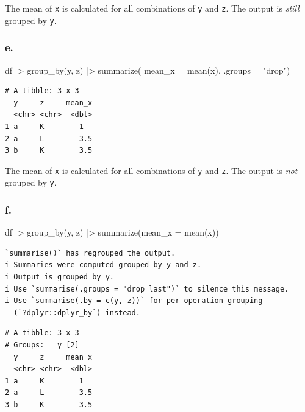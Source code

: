 \documentclass[
  letterpaper,
  DIV=11,
  numbers=noendperiod]{scrreprt}
\newenvironment{Shaded}{\begin{snugshade}}{\end{snugshade}}
\newcommand{\AttributeTok}[1]{\textcolor[rgb]{0.40,0.45,0.13}{#1}}
\newcommand{\FunctionTok}[1]{\textcolor[rgb]{0.28,0.35,0.67}{#1}}
\newcommand{\NormalTok}[1]{\textcolor[rgb]{0.00,0.23,0.31}{#1}}
\newcommand{\SpecialCharTok}[1]{\textcolor[rgb]{0.37,0.37,0.37}{#1}}
\newcommand{\StringTok}[1]{\textcolor[rgb]{0.13,0.47,0.30}{#1}}
\begin{document}
The mean of \texttt{x} is calculated for all combinations of \texttt{y}
and \texttt{z}. The output is \emph{still} grouped by \texttt{y}.

\subsubsection{e.}\label{e.}

\begin{Shaded}
\begin{Highlighting}[]
\NormalTok{df }\SpecialCharTok{|\textgreater{}}
  \FunctionTok{group\_by}\NormalTok{(y, z) }\SpecialCharTok{|\textgreater{}}
  \FunctionTok{summarize}\NormalTok{(}
    \AttributeTok{mean\_x =} \FunctionTok{mean}\NormalTok{(x),}
    \AttributeTok{.groups =} \StringTok{"drop"}\NormalTok{)}
\end{Highlighting}
\end{Shaded}

\begin{verbatim}
# A tibble: 3 x 3
  y     z     mean_x
  <chr> <chr>  <dbl>
1 a     K        1  
2 a     L        3.5
3 b     K        3.5
\end{verbatim}

The mean of \texttt{x} is calculated for all combinations of \texttt{y}
and \texttt{z}. The output is \emph{not} grouped by \texttt{y}.

\subsubsection{f.}\label{f.}

\begin{Shaded}
\begin{Highlighting}[]
\NormalTok{df }\SpecialCharTok{|\textgreater{}}
  \FunctionTok{group\_by}\NormalTok{(y, z) }\SpecialCharTok{|\textgreater{}}
  \FunctionTok{summarize}\NormalTok{(}\AttributeTok{mean\_x =} \FunctionTok{mean}\NormalTok{(x))}
\end{Highlighting}
\end{Shaded}

\begin{verbatim}
`summarise()` has regrouped the output.
i Summaries were computed grouped by y and z.
i Output is grouped by y.
i Use `summarise(.groups = "drop_last")` to silence this message.
i Use `summarise(.by = c(y, z))` for per-operation grouping
  (`?dplyr::dplyr_by`) instead.
\end{verbatim}

\begin{verbatim}
# A tibble: 3 x 3
# Groups:   y [2]
  y     z     mean_x
  <chr> <chr>  <dbl>
1 a     K        1  
2 a     L        3.5
3 b     K        3.5
\end{verbatim}
\end{document}
